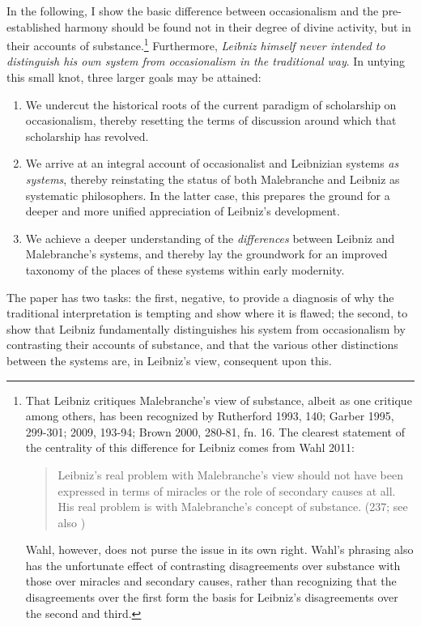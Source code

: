 \documentclass{article}
\begin{document}
In the following, I show the basic difference between occasionalism and
the pre-established harmony should be found not in their degree of
divine activity, but in their accounts of substance.\footnote{That
  Leibniz critiques Malebranche's view of substance, albeit as one
  critique among others, has been recognized by Rutherford 1993, 140;
  Garber 1995, 299-301; 2009, 193-94; Brown 2000, 280-81, fn. 16. The
  clearest statement of the centrality of this difference for Leibniz
  comes from Wahl 2011:

  \begin{quote}
  Leibniz's real problem with Malebranche's view should not have been
  expressed in terms of miracles or the role of secondary causes at all.
  His real problem is with Malebranche's concept of substance. (237; see
  also \autocite{Whipple2010})
  \end{quote}

  Wahl, however, does not purse the issue in its own right. Wahl's
  phrasing also has the unfortunate effect of contrasting disagreements
  over substance with those over miracles and secondary causes, rather
  than recognizing that the disagreements over the first form the basis
  for Leibniz's disagreements over the second and third.} Furthermore,
\emph{Leibniz himself never intended to distinguish his own system from
occasionalism in the traditional way}. In untying this small knot, three
larger goals may be attained:

\begin{enumerate}
\item We undercut the historical roots of the current paradigm of
  scholarship on occasionalism, thereby resetting the terms of
  discussion around which that scholarship has revolved.
\item We arrive at an integral account of occasionalist and Leibnizian
  systems \emph{as systems}, thereby reinstating the status of both
  Malebranche and Leibniz as systematic philosophers. In the latter
  case, this prepares the ground for a deeper and more unified
  appreciation of Leibniz's development.
\item We achieve a deeper understanding of the \emph{differences} between
  Leibniz and Malebranche's systems, and thereby lay the groundwork for
  an improved taxonomy of the places of these systems within early
  modernity.
\end{enumerate}

The paper has two tasks: the first, negative, to provide a diagnosis of
why the traditional interpretation is tempting and show where it is
flawed; the second, to show that Leibniz fundamentally distinguishes his
system from occasionalism by contrasting their accounts of substance,
and that the various other distinctions between the systems are, in
Leibniz's view, consequent upon this.
\end{document}
